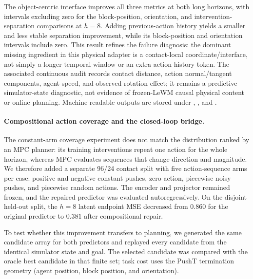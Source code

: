 \documentclass{article}
\begin{document}
The object-centric interface improves all three metrics at both long
horizons, with intervals excluding zero for the block-position, orientation,
and intervention-separation comparisons at $h=8$. Adding previous-action
history yields a smaller and less stable separation improvement, while its
block-position and orientation intervals include zero. This result refines
the failure diagnosis: the dominant missing ingredient in this physical
adapter is a contact-local coordinate/interface, not simply a longer temporal
window or an extra action-history token. The associated continuous audit
records contact distance, action normal/tangent components, agent speed, and
observed rotation effect; it remains a predictive simulator-state diagnostic,
not evidence of frozen-LeWM causal physical content or online planning.
Machine-readable outputs are stored under
,
,
and .

\paragraph{Compositional action coverage and the closed-loop bridge.}
The constant-arm coverage experiment does not match the distribution ranked by
an MPC planner: its training interventions repeat one action for the whole
horizon, whereas MPC evaluates sequences that change direction and magnitude.
We therefore added a separate 96/24 contact split with five action-sequence
arms per case: positive and negative constant pushes, zero action, piecewise
noisy pushes, and piecewise random actions. The encoder and projector remained
frozen, and the repaired predictor was evaluated autoregressively. On the
disjoint held-out split, the $h=8$ latent endpoint MSE decreased from $0.860$
for the original predictor to $0.381$ after compositional repair.

To test whether this improvement transfers to planning, we generated the same
candidate array for both predictors and replayed every candidate from the
identical simulator state and goal. The selected candidate was compared with
the oracle best candidate in that finite set; task cost uses the PushT
termination geometry (agent position, block position, and orientation).
\end{document}
